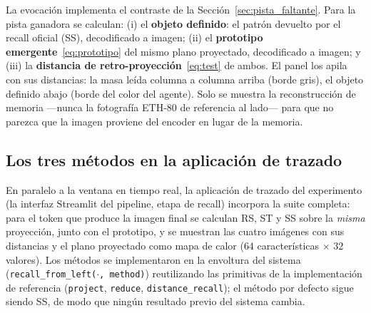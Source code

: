 La evocación implementa el contraste de la Sección~\ref{sec:pista_faltante}.
Para la pista ganadora se calculan:
(i) el \textbf{objeto definido}: el patrón devuelto por el recall oficial (SS),
decodificado a imagen;
(ii) el \textbf{prototipo emergente}~\eqref{eq:prototipo} del mismo plano proyectado,
decodificado a imagen; y
(iii) la \textbf{distancia de retro-proyección}~\eqref{eq:test} de ambos.
El panel los apila con sus distancias: la masa leída columna a columna arriba
(borde gris), el objeto definido abajo (borde del color del agente).
Solo se muestra la reconstrucción de memoria ---nunca la fotografía ETH-80 de
referencia al lado--- para que no parezca que la imagen proviene del encoder en lugar
de la memoria.

\subsection{Los tres métodos en la aplicación de trazado}

En paralelo a la ventana en tiempo real, la aplicación de trazado del experimento
(la interfaz Streamlit del pipeline, etapa de recall) incorpora la suite completa:
para el token que produce la imagen final se calculan RS, ST y SS sobre la
\emph{misma} proyección, junto con el prototipo, y se muestran las cuatro imágenes con
sus distancias y el plano proyectado como mapa de calor
($64$ características $\times$ $32$ valores).
Los métodos se implementaron en la envoltura del sistema
(\texttt{recall\_from\_left($\cdot$, method)}) reutilizando las primitivas de la
implementación de referencia (\texttt{project}, \texttt{reduce},
\texttt{distance\_recall}); el método por defecto sigue siendo SS, de modo que ningún
resultado previo del sistema cambia.

